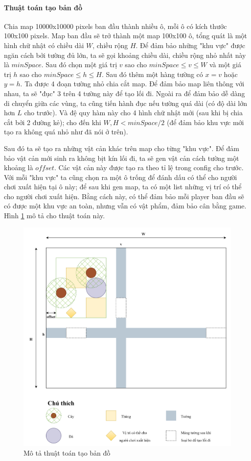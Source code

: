 \documentclass[12pt,a4paper]{article}
\begin{document}
  \paragraph{Thuật toán tạo bản đồ}\mbox{}

  Chia map 10000x10000 pixels ban đầu thành nhiều ô, mỗi ô có kích thước 100x100 pixels. Map ban đầu sẽ trở thành một map 100x100 ô, tổng quát là một hình chữ nhật có chiều dài $W$, chiều rộng $H$. Để đảm bảo những "khu vực" được ngăn cách bởi tường đủ lớn, ta sẽ gọi khoảng chiều dài, chiều rộng nhỏ nhất này là $minSpace$. Sau đó chọn một giá trị $v$ sao cho $minSpace \le v \le W$ và một giá trị $h$ sao cho $minSpace \le h \le H$. Sau đó thêm một hàng tường có $x = v$ hoặc $y = h$. Ta được 4 đoạn tường nhỏ chia cắt map. Để đảm bảo map liên thông với nhau, ta sẽ "đục" 3 trên 4 tường này để tạo lối đi. Ngoài ra để đảm bảo dễ dàng di chuyển giữa các vùng, ta cũng tiến hành đục nếu tường quá dài (có độ dài lớn hơn $L$ cho trước). Và đệ quy hàm này cho 4 hình chữ nhật mới (sau khi bị chia cắt bởi 2 đường kẻ); cho đến khi $W, H < minSpace/2$ (để đảm bảo khu vực mới tạo ra không quá nhỏ như đã nói ở trên).

  Sau đó ta sẽ tạo ra những vật cản khác trên map cho từng "khu vực". Để đảm bảo vật cản mới sinh ra không bịt kín lối đi, ta sẽ gen vật cản cách tường một khoảng là $offset$. Các vật cản này được tạo ra theo tỉ lệ trong config cho trước. Với mỗi "khu vực" ta cũng chọn ra một ô trống để đánh dấu có thể cho người chơi xuất hiện tại ô này; để sau khi gen map, ta có một list những vị trí có thể cho người chơi xuất hiện. Bằng cách này, có thể đảm bảo mỗi player ban đầu sẽ có được một khu vực an toàn, nhưng vẫn có vật phẩm, đảm bảo cân bằng game. Hình \ref{genmap} mô tả cho thuật toán này.
  
  \begin{figure}[H]
  \centering
  \includegraphics[width=\textwidth]{Img/map/genmap.png}
  \caption{Mô tả thuật toán tạo bản đồ}
  \label{genmap}
  \end{figure}
  
\end{document}
